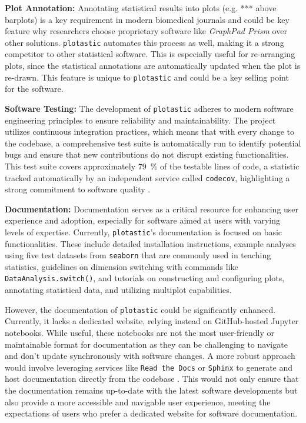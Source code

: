 \textbf{Plot Annotation:} Annotating statistical results into plots (e.g. ***
above barplots) is a key requirement in modern biomedical journals and could be
key feature why researchers choose proprietary software like \textit{GraphPad
Prism} over other solutions. \texttt{plotastic} automates this process as well,
making it a strong competitor to other statistical software. This is especially
useful for re-arranging plots, since the statistical annotations are
automatically updated when the plot is re-drawn. This feature is unique to
\texttt{plotastic} and could be a key selling point for the software.


\textbf{Software Testing:} The development of \texttt{plotastic} adheres to
modern software engineering principles to ensure reliability and
maintainability. The project utilizes continuous integration practices, which
means that with every change to the codebase, a comprehensive test suite is
automatically run to identify potential bugs and ensure that new contributions
do not disrupt existing functionalities. This test suite covers approximately
\SI{79}{\percent} of the testable lines of code, a statistic tracked
automatically by an independent service called \texttt{codecov}, highlighting a
strong commitment to software quality \cite{Codecov2024}.



\textbf{Documentation:}
Documentation serves as a critical resource for enhancing user experience and
adoption, especially for software aimed at users with varying levels of
expertise. Currently, \texttt{plotastic}'s documentation is focused on basic
functionalities. These include detailed installation instructions, example
analyses using five test datasets from \texttt{seaborn} that are commonly used
in teaching statistics, guidelines on dimension switching with commands like
\texttt{DataAnalysis.switch()}, and tutorials on constructing and configuring
plots, annotating statistical data, and utilizing multiplot capabilities.

However, the documentation of \texttt{plotastic} could be significantly
enhanced. Currently, it lacks a dedicated website, relying instead on
GitHub-hosted Jupyter notebooks. While useful, these notebooks are not the most
user-friendly or maintainable format for documentation as they can be
challenging to navigate and don't update synchronously with software changes. A
more robust approach would involve leveraging services like \texttt{Read the Docs}
or \texttt{Sphinx} to generate and host documentation directly from the codebase
\cite{ReadDocs2024, Sphinx2024}. This would not only ensure
that the documentation remains up-to-date with the latest software developments
but also provide a more accessible and navigable user experience, meeting the
expectations of users who prefer a dedicated website for software documentation.



